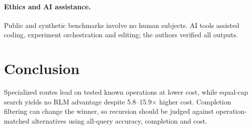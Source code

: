 \documentclass{article}
\begin{document}
\paragraph{Ethics and AI assistance.}
Public and synthetic benchmarks involve no human subjects. AI tools assisted coding, experiment orchestration and editing; the authors verified all outputs.

\section{Conclusion}

Specialized routes lead on tested known operations at lower cost, while equal-cap search yields no RLM advantage despite 5.8--15.9$\times$ higher cost. Completion filtering can change the winner, so recursion should be judged against operation-matched alternatives using all-query accuracy, completion and cost.




\appendix
\raggedbottom



\end{document}
